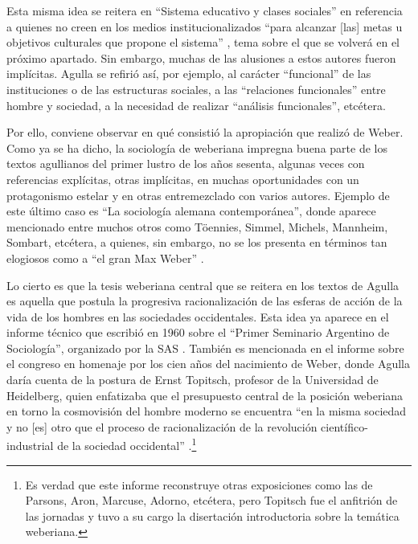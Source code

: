Esta misma idea se reitera en \enquote{Sistema educativo y clases sociales} en referencia a quienes no creen en los medios institucionalizados \enquote{para alcanzar [las] metas u objetivos culturales que propone el sistema} \parencite[33]{1642-AGULLA1964}, tema sobre el que se volverá en el próximo apartado. Sin embargo, muchas de las alusiones a estos autores fueron implícitas. Agulla se refirió así, por ejemplo, al carácter \enquote{funcional} de las instituciones o de las estructuras sociales, a las \enquote{relaciones funcionales} entre hombre y sociedad, a la necesidad de realizar \enquote{análisis funcionales}, etcétera.

Por ello, conviene observar en qué consistió la apropiación que realizó de Weber. Como ya se ha dicho, la sociología de weberiana impregna buena parte de los textos agullianos del primer lustro de los años sesenta, algunas veces con referencias explícitas, otras implícitas, en muchas oportunidades con un protagonismo estelar y en otras entremezclado con varios autores. Ejemplo de este último caso es \enquote{La sociología alemana contemporánea}, donde aparece mencionado entre muchos otros como Töennies, Simmel, Michels, Mannheim, Sombart, etcétera, a quienes, sin embargo, no se los presenta en términos tan elogiosos como a \enquote{el gran Max Weber} \parencite[90]{1643-AGULLA1963}.

Lo cierto es que la tesis weberiana central que se reitera en los textos de Agulla es aquella que postula la progresiva racionalización de las esferas de acción de la vida de los hombres en las sociedades occidentales. Esta idea ya aparece en el informe técnico que escribió en 1960 sobre el \enquote{Primer Seminario Argentino de Sociología}, organizado por la SAS \parencite{1641-AGULLA1965}. También es mencionada en el informe sobre el congreso en homenaje por los cien años del nacimiento de Weber, donde Agulla daría cuenta de la postura de Ernst Topitsch, profesor de la Universidad de Heidelberg, quien enfatizaba que el presupuesto central de la posición weberiana en torno la cosmovisión del hombre moderno se encuentra \enquote{en la misma sociedad y no [es] otro que el proceso de racionalización de la revolución científico-industrial de la sociedad occidental} \parencite[4]{1635-AGULLA1964}.\footnote{Es verdad que este informe reconstruye otras exposiciones como las de Parsons, Aron, Marcuse, Adorno, etcétera, pero Topitsch fue el anfitrión de las jornadas y tuvo a su cargo la disertación introductoria sobre la temática weberiana.}

